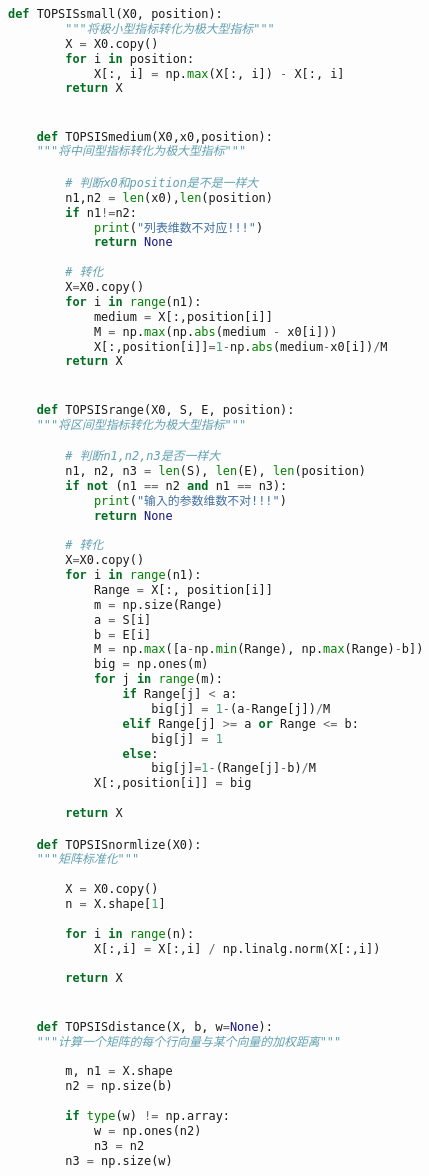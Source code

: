 \documentclass[withoutpreface]{cumcmthesis}
\begin{document}
    \begin{lstlisting}[language=python ,caption={函数定义} ]
    def TOPSISsmall(X0, position):
        """将极小型指标转化为极大型指标"""
        X = X0.copy()
        for i in position:
            X[:, i] = np.max(X[:, i]) - X[:, i]
        return X


    def TOPSISmedium(X0,x0,position):
    """将中间型指标转化为极大型指标"""

        # 判断x0和position是不是一样大
        n1,n2 = len(x0),len(position)
        if n1!=n2:
            print("列表维数不对应!!!")
            return None
        
        # 转化
        X=X0.copy()
        for i in range(n1):
            medium = X[:,position[i]]
            M = np.max(np.abs(medium - x0[i]))
            X[:,position[i]]=1-np.abs(medium-x0[i])/M
        return X


    def TOPSISrange(X0, S, E, position):
    """将区间型指标转化为极大型指标"""

        # 判断n1,n2,n3是否一样大
        n1, n2, n3 = len(S), len(E), len(position)
        if not (n1 == n2 and n1 == n3):
            print("输入的参数维数不对!!!")
            return None
    
        # 转化
        X=X0.copy()
        for i in range(n1):
            Range = X[:, position[i]]
            m = np.size(Range)
            a = S[i]
            b = E[i]
            M = np.max([a-np.min(Range), np.max(Range)-b])
            big = np.ones(m)
            for j in range(m):
                if Range[j] < a:
                    big[j] = 1-(a-Range[j])/M
                elif Range[j] >= a or Range <= b:
                    big[j] = 1
                else:
                    big[j]=1-(Range[j]-b)/M
            X[:,position[i]] = big
        
        return X

    def TOPSISnormlize(X0):
    """矩阵标准化"""
        
        X = X0.copy()
        n = X.shape[1]
        
        for i in range(n):
            X[:,i] = X[:,i] / np.linalg.norm(X[:,i])
        
        return X


    def TOPSISdistance(X, b, w=None):
    """计算一个矩阵的每个行向量与某个向量的加权距离"""
    
        m, n1 = X.shape
        n2 = np.size(b)
    
        if type(w) != np.array:
            w = np.ones(n2)
            n3 = n2
        n3 = np.size(w)
    

\end{lstlisting}
\end{document}
